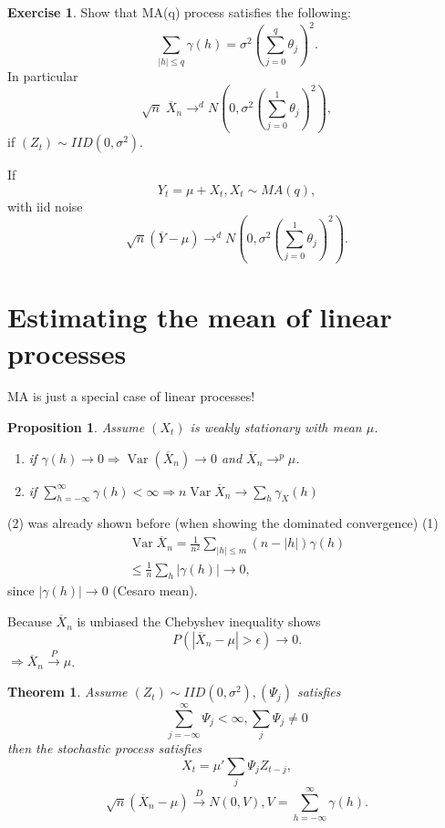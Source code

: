 \documentclass[12pt,a4paper, notitlepage]{book}
\theoremstyle{definition} %
\newtheorem{exercise}[definition]{Exercise}
\theoremstyle{plain} %
\newtheorem{theorem}[definition]{Theorem}
\newtheorem{proposition}[definition]{Proposition}
\DeclareMathOperator{\Var}{Var}
\begin{document}
\begin{exercise}
Show that MA(q) process satisfies the following:
\[ \sum_{|h| \leq q} \gamma(h) = \sigma^2(\sum_{j = 0}^q \theta_j)^2 . \]
 In particular
\[ \sqrt{n } \; \overline{X}_n \rightarrow^d N(0, \sigma^2(\sum_{j=0}^1 \theta_j)^2), \]  
if $(Z_t) \sim IID(0, \sigma^2)$.

If 
\[ Y_t = \mu + X_t, X_t \sim MA(q) , \]
 with iid noise 
\[ \sqrt{n}(\overline{Y} - \mu) \rightarrow^d N(0, \sigma^2(\sum_{j=0}^1 \theta_j)^2). \]
\end{exercise}

\section{Estimating the mean of linear processes}

MA is just a special case of linear processes! 

\begin{proposition}
Assume $(X_t)$ is weakly stationary with mean $\mu$.
\begin{enumerate}
\item if $\gamma(h) \rightarrow 0 \Rightarrow \Var(\overline{X}_n) \rightarrow 0$ and $\overline{X}_n \rightarrow^p \mu$.
\item if $\sum_{h = -\infty}^\infty\gamma(h) < \infty \Rightarrow n \Var \overline{X}_n \rightarrow \sum_h \gamma_X(h)$
\end{enumerate}
\end{proposition}
\proof
(2) was already shown before (when showing the dominated convergence)
(1)  
\begin{align*} \Var \overline{X}_n = \frac{1}{n^2} \sum_{|h| \leq m} (n - |h|)\gamma(h) \\ 
\leq \frac{1}{n} \sum_h |\gamma(h)| \rightarrow 0, \end{align*}
 since $|\gamma(h)| \rightarrow 0$ (Cesaro mean). 

Because $\overline{X}_n$ is unbiased the Chebyshev inequality shows 
\[ P(|\overline{X}_n - \mu| > \epsilon) \rightarrow 0 . \]
$\Rightarrow \overline{X}_n \overset{P}{\rightarrow} \mu$.
\endproof

\begin{theorem}
Assume $(Z_t) \sim IID(0, \sigma^2), (\Psi_j)$ satisfies 
\[ \sum_{j = -\infty}^\infty \Psi_j< \infty, \sum_j \Psi_j \neq 0 \]
 then the stochastic process satisfies 
\[ X_t = \mu ' \sum_j \Psi_j Z_{t-j} , \]
\[ \sqrt{n}(\overline{X}_n - \mu) \overset{D}{\rightarrow} N(0, V), V = \sum_{h=-\infty}^\infty \gamma(h). \]
\end{theorem}
\end{document}
